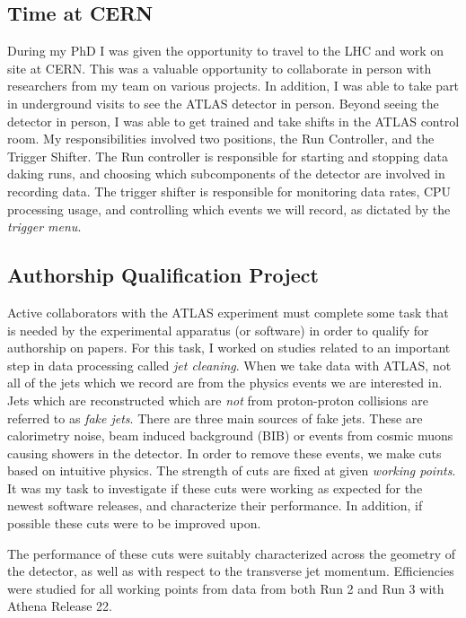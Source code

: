 \documentclass[12pt]{article}
\begin{document}
\subsection{Time at CERN}
During my PhD I was given the opportunity to travel to the LHC and work on site
at CERN. This was a valuable opportunity to collaborate in person with
researchers from my team on various projects. In addition, I was able to take
part in underground visits to see the ATLAS detector in person. Beyond seeing
the detector in person, I was able to get trained and take shifts in the ATLAS
control room. My responsibilities involved two positions, the Run Controller,
and the Trigger Shifter. The Run controller is responsible for starting and
stopping data daking runs, and choosing which subcomponents of the detector are
involved in recording data. The trigger shifter is responsible for monitoring
data rates, CPU processing usage, and controlling which events we will record,
as dictated by the \textit{trigger menu}.

\subsection{Authorship Qualification Project}
Active collaborators with the ATLAS experiment must complete some task that is
needed by the experimental apparatus (or software) in order to qualify for
authorship on papers. For this task, I worked on studies related to an important
step in data processing called \textit{jet cleaning}. When we take data with
ATLAS, not all of the jets which we record are from the physics events we are
interested in. Jets which are reconstructed which are \textit{not} from
proton-proton collisions are referred to as \textit{fake jets}. There are three
main sources of fake jets. These are calorimetry noise, beam induced background
(BIB) or events from cosmic muons causing showers in the detector. In order to
remove these events, we make cuts based on intuitive physics. The strength of
cuts are fixed at given \textit{working points}. It was my task to investigate
if these cuts were working as expected for the newest software releases, and
characterize their performance. In addition, if possible these cuts were to be
improved upon.

The performance of these cuts were suitably characterized across the geometry of
the detector, as well as with respect to the transverse jet momentum.
Efficiencies were studied for all working points from data from both Run 2 and
Run 3 with Athena Release 22.
\end{document}
